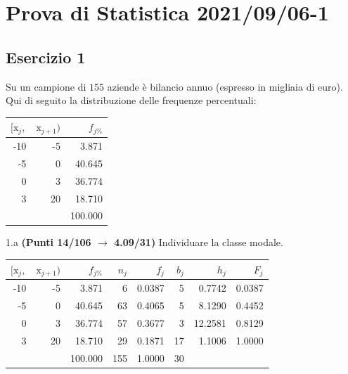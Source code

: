 \documentclass[
  11pt,
]{book}
\theoremstyle{mytheoremstyle}
\theoremstyle{mydefstyle}
\newenvironment{sol}
  {
  \begin{tcolorbox}[enhanced,breakable,arc=0.1mm,boxrule=1pt,colback=white,colframe=iblue,
  title=\bf \fontfamily{lmss}\selectfont \hspace{.5 cm} Soluzione,drop fuzzy shadow]

}{
\end{tcolorbox}
  }
\begin{document}
\section{Prova di Statistica 2021/09/06-1}\label{prova-di-statistica-20210906-1}

\subsection{Esercizio 1}\label{esercizio-1-9}

Su un campione di \(155\) aziende è bilancio annuo (espresso in migliaia di euro). Qui di seguito la distribuzione delle frequenze percentuali:

\begin{table}[H]
\centering
\begin{tabular}{rrr}
\toprule
$[\text{x}_j,$ & $\text{x}_{j+1})$ & $f_{j\%}$\\
\midrule
-10 & -5 & 3.871\\
-5 & 0 & 40.645\\
0 & 3 & 36.774\\
3 & 20 & 18.710\\
 &  & 100.000\\
\bottomrule
\end{tabular}
\end{table}

1.a \textbf{(Punti 14/106 \(\rightarrow\) 4.09/31)} Individuare la classe modale.

\begin{sol}

\begin{table}[H]
\centering
\begin{tabular}{rrrrrrrr}
\toprule
$[\text{x}_j,$ & $\text{x}_{j+1})$ & $f_{j\%}$ & $n_j$ & $f_j$ & $b_j$ & $h_j$ & $F_j$\\
\midrule
-10 & -5 & 3.871 & 6 & 0.0387 & 5 & 0.7742 & 0.0387\\
-5 & 0 & 40.645 & 63 & 0.4065 & 5 & 8.1290 & 0.4452\\
0 & 3 & 36.774 & 57 & 0.3677 & 3 & 12.2581 & 0.8129\\
3 & 20 & 18.710 & 29 & 0.1871 & 17 & 1.1006 & 1.0000\\
 &  & 100.000 & 155 & 1.0000 & 30 &  & \\
\bottomrule
\end{tabular}
\end{table}

\end{sol}
\end{document}
